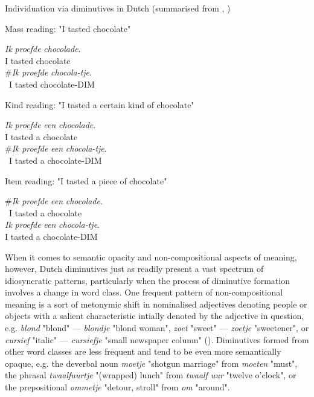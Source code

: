 \begin{exe}
\ex \label{ex:dutchquants}
Individuation via diminutives in Dutch (summarised from \citeauthor{DeBelder+2008}, \citeyear{DeBelder+2008})
\begin{xlist}
\ex \label{ex:dutchmass}
Mass reading: "I tasted chocolate" \par
\begin{multicols}{2}
\gll
\textit{Ik} \textit{proefde} \textit{chocolade}.\\
I tasted chocolate \\
\trans
\columnbreak
\gll
\#\textit{Ik} \textit{proefde} \textit{chocola-tje}.\\
~I tasted chocolate-DIM \\
\trans
\end{multicols}
\ex \label{ex:dutchkind} 
Kind reading: "I tasted a certain kind of chocolate" \par
\begin{multicols}{2}
\gll
\textit{Ik} \textit{proefde} \textit{een} \textit{chocolade}.\\
I tasted a chocolate \\
\trans
\columnbreak
\gll
\#\textit{Ik} \textit{proefde} \textit{een} \textit{chocola-tje}.\\
~I tasted a chocolate-DIM \\
\trans
\end{multicols}
\ex \label{ex:dutchitem}
Item reading: "I tasted a piece of chocolate" \par
\begin{multicols}{2}
\gll
\#\textit{Ik} \textit{proefde} \textit{een} \textit{chocolade}.\\
~I tasted a chocolate \\
\trans
\columnbreak
\gll
\textit{Ik} \textit{proefde} \textit{een} \textit{chocola-tje}.\\
I tasted a chocolate-DIM \\
\trans
\end{multicols}
\end{xlist}
\end{exe}

When it comes to semantic opacity and non-compositional aspects of meaning, however, Dutch diminutives just as readily present a vast spectrum of idiosyncratic patterns, particularly when the process of diminutive formation involves a change in word class. One frequent pattern of non-compositional meaning is a sort of metonymic shift in nominalised adjectives denoting people or objects with a salient characteristic intially denoted by the adjective in question, e.g. \textit{blond} "blond" --- \textit{blondje} "blond woman", \textit{zoet} "sweet" --- \textit{zoetje} "sweetener", or \textit{cursief} "italic" --- \textit{cursiefje} "small newspaper column" (\cite{taalportaal}). Diminutives formed from other word classes are less frequent and tend to be even more semantically opaque, e.g. the deverbal noun \textit{moetje} "shotgun marriage" from \textit{moeten} "must", the phrasal \textit{twaalfuurtje} "(wrapped) lunch" from \textit{twaalf uur} "twelve o'clock", or the prepositional \textit{ommetje} "detour, stroll" from \textit{om} "around". 

